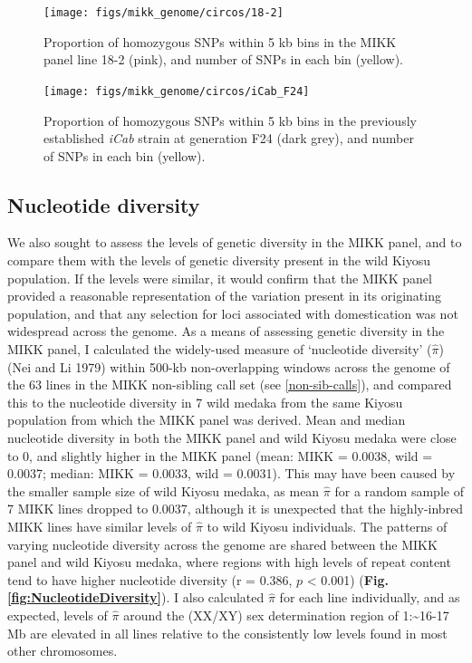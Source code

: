 \documentclass[
]{book}
\begin{document}
\begin{figure}
\texttt{[image: figs/mikk\_genome/circos/18-2]} \caption{Proportion of homozygous SNPs within 5 kb bins in the MIKK panel line 18-2 (pink), and number of SNPs in each bin (yellow).}\label{fig:circos-18-2}
\end{figure}



\begin{figure}
\texttt{[image: figs/mikk\_genome/circos/iCab\_F24]} \caption{Proportion of homozygous SNPs within 5 kb bins in the previously established \emph{iCab} strain at generation F24 (dark grey), and number of SNPs in each bin (yellow).}\label{fig:circos-iCab-F24}
\end{figure}

\hypertarget{nuc-div}{%
\subsection{Nucleotide diversity}\label{nuc-div}}

We also sought to assess the levels of genetic diversity in the MIKK panel, and to compare them with the levels of genetic diversity present in the wild Kiyosu population. If the levels were similar, it would confirm that the MIKK panel provided a reasonable representation of the variation present in its originating population, and that any selection for loci associated with domestication was not widespread across the genome. As a means of assessing genetic diversity in the MIKK panel, I calculated the widely-used measure of `nucleotide diversity' (\(\hat{\pi}\)) (Nei and Li 1979) within 500-kb non-overlapping windows across the genome of the 63 lines in the MIKK non-sibling call set (see \ref{non-sib-calls}), and compared this to the nucleotide diversity in 7 wild medaka from the same Kiyosu population from which the MIKK panel was derived. Mean and median nucleotide diversity in both the MIKK panel and wild Kiyosu medaka were close to 0, and slightly higher in the MIKK panel (mean: MIKK = 0.0038, wild = 0.0037; median: MIKK = 0.0033, wild = 0.0031). This may have been caused by the smaller sample size of wild Kiyosu medaka, as mean \(\hat{\pi}\) for a random sample of 7 MIKK lines dropped to 0.0037, although it is unexpected that the highly-inbred MIKK lines have similar levels of \(\hat{\pi}\) to wild Kiyosu individuals. The patterns of varying nucleotide diversity across the genome are shared between the MIKK panel and wild Kiyosu medaka, where regions with high levels of repeat content tend to have higher nucleotide diversity (r = 0.386, \(p\) \textless{} 0.001) (\textbf{Fig. \ref{fig:NucleotideDiversity}}). I also calculated \(\hat{\pi}\) for each line individually, and as expected, levels of \(\hat{\pi}\) around the (XX/XY) sex determination region of 1:\textasciitilde16-17 Mb are elevated in all lines relative to the consistently low levels found in most other chromosomes.
\end{document}

